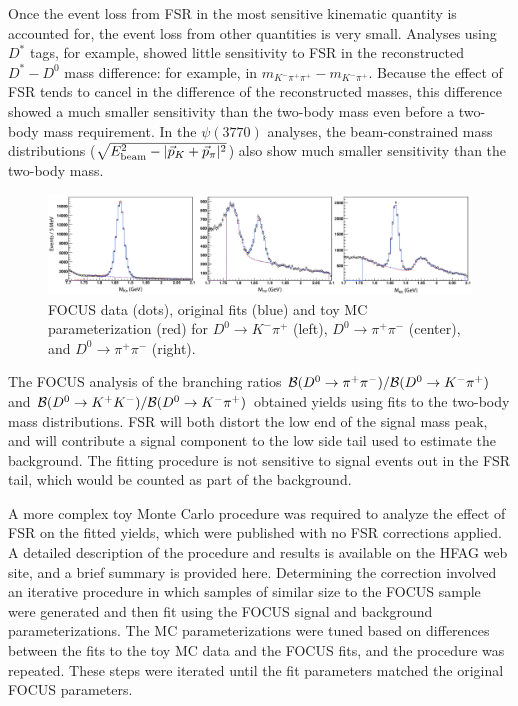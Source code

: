 Once the event loss from FSR in the most sensitive kinematic 
quantity is accounted for, the event loss from other quantities 
is very small.  Analyses using $D^*$ tags, for example, showed 
little sensitivity to FSR in the reconstructed $D^*-D^0$ mass 
difference: for example, in $m_{K^-\pi^+\pi^+}-m_{K^-\pi^+}$. 
Because the effect of FSR tends to cancel in the difference of 
the reconstructed masses, this difference showed a much smaller 
sensitivity than the two-body mass even before a two-body mass 
requirement. In the $\psi(3770)$ analyses, the beam-constrained 
mass distributions 
($\sqrt{E_{\rm beam}^2 - |\vec{p}_K + \vec{p}_\pi|^2}$)  
also show much smaller sensitivity than the two-body mass.
\begin{figure}
\begin{center}
\includegraphics[width=1.00\textwidth]{figures/charm/FocusFits.pdf}
\caption{FOCUS data (dots), original fits (blue) and 
toy MC parameterization (red) for $D^0\to K^-\pi^+$ (left), 
$D^0\to \pi^+\pi^-$ (center), and $D^0\to \pi^+\pi^-$ (right).}
\label{fig:FocusFits}
\end{center}
\end{figure}

The FOCUS \cite{Link:2002hi} analysis of the branching ratios 
${\cal B}(D^0\to \pi^+\pi^-)/{\cal B}(D^0\to K^-\pi^+)$ and 
${\cal B}(D^0\to K^+ K^-)/{\cal B}(D^0\to K^-\pi^+)$ obtained 
yields using fits to the two-body mass distributions.  FSR will 
both distort the low end of the signal mass peak, and will 
contribute a signal component to the low side tail used to 
estimate the background.  The fitting procedure is not sensitive 
to signal events out in the FSR tail, which would be counted as 
part of the background.

A more complex toy Monte Carlo procedure was required to analyze 
the effect of FSR on the fitted yields, which were published with 
no FSR corrections applied.  A detailed description of the procedure 
and results is available on the HFAG web site, 
and a brief summary is provided
here.  Determining the correction involved an iterative procedure in which samples of similar size to the FOCUS sample were 
generated and then fit using the FOCUS signal and background 
parameterizations.  The MC parameterizations were tuned based 
on differences between the fits to the toy MC data and the FOCUS 
fits, and the procedure was repeated. These steps were iterated until 
the fit parameters matched the original FOCUS parameters.  

